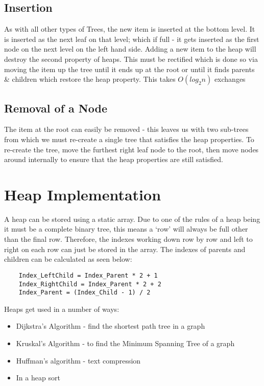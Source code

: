 \subsection{Insertion}
As with all other types of Trees, the new item is inserted at the bottom level. It is inserted as the next leaf on that level; which if full - it gets inserted as the first node on the next level on the left hand side. Adding a new item to the heap will destroy the second property of heaps. This must be rectified which is done so via moving the item up the tree until it ends up at the root or until it finds parents \& children which restore the heap property. This takes $O(log_2 n)$ exchanges 

\subsection{Removal of a Node}
The item at the root can easily be removed - this leaves us with two sub-trees from which we must re-create a single tree that satisfies the heap properties. To re-create the tree, move the furthest right leaf node to the root, then move nodes around internally to ensure that the heap properties are still satisfied.

\section{Heap Implementation}
A heap can be stored using a static array. Due to one of the rules of a heap being it must be a complete binary tree, this means a `row' will always be full other than the final row. Therefore, the indexes working down row by row and left to right on each row can just be stored in the array. The indexes of parents and children can be calculated as seen below:
\begin{verbatim}
    Index_LeftChild = Index_Parent * 2 + 1 
    Index_RightChild = Index_Parent * 2 + 2
    Index_Parent = (Index_Child - 1) / 2
\end{verbatim}

Heaps get used in a number of ways:
\begin{itemize}
    \item Dijkstra's Algorithm - find the shortest path tree in a graph
    \item Kruskal's Algorithm - to find the Minimum Spanning Tree of a graph
    \item Huffman's algorithm - text compression
    \item In a heap sort
\end{itemize}